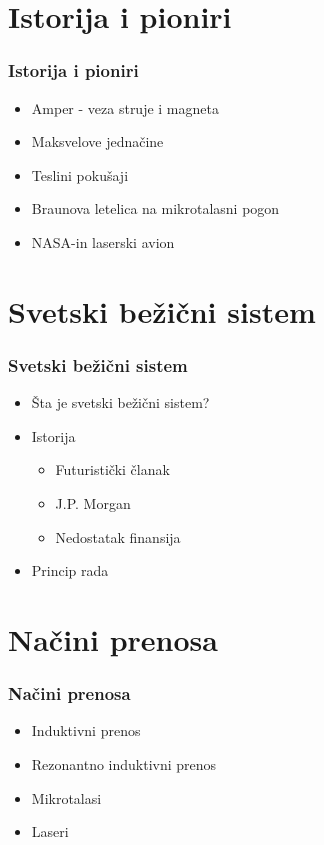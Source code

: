 \documentclass[10pt]{beamer}
\begin{document}
\section{Istorija i pioniri}

\begin{frame}\frametitle{Istorija i pioniri}
	\begin{itemize}	
		\item Amper - veza struje i magneta
		\item Maksvelove jednačine
		\item Teslini pokušaji
		\item Braunova letelica na mikrotalasni pogon
		\item NASA-in laserski avion
	\end{itemize}
\end{frame}

\section{Svetski bežični sistem}

\begin{frame}\frametitle{Svetski bežični sistem}
	\begin{itemize}	
		\item Šta je svetski bežični sistem?
		\item Istorija
			\begin{itemize}
				\item Futuristički članak
				\item J.P. Morgan
				\item Nedostatak finansija
			\end{itemize}
		\item Princip rada
	\end{itemize}
\end{frame}

\section{Načini prenosa}

\begin{frame}\frametitle{Načini prenosa}
	\begin{itemize}
		\item Induktivni prenos
		\item Rezonantno induktivni prenos
		\item Mikrotalasi
		\item Laseri
	\end{itemize}
\end{frame}
\end{document}
